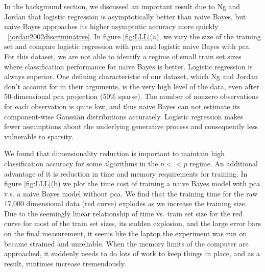 	In the background section, we discussed an important result due to Ng and Jordan that logistic regression is asymptotically better than naive Bayes, but naive Bayes approaches its higher asymptotic accuracy more quickly ~\ref{jordan2002discriminative}. In figure \ref{fig:LLL}(a), we vary the size of the training set and compare logistic regression with pca and logistic naive Bayes with pca. For this dataset, we are not able to identify a regime of small train set sizes where classification performance for naive Bayes is better. Logistic regression is always superior. One defining characteristic of our dataset, which Ng and Jordan don't account for in their arguments, is the very high level of the data, even after 50-dimensional pca projection (50\% sparse). The number of nonzero observations for each observation is quite low, and thus naive Bayes can not estimate its component-wise Gaussian distributions accurately. Logistic regression makes fewer assumptions about the underlying generative process and consequently less vulnerable to sparsity. 

	We found that dimensionality reduction is important to maintain high classification accuracy for some algorithms in the $n << p$ regime. An additional advantage of it is reduction in time and memory requirements for training. In figure \ref{fig:LLL}(b) we plot the time cost of training a naive Bayes model with pca v.s. a naive Bayes model without pca. We find that the training time for the raw 17,000 dimensional data (red curve) explodes as we increase the training size. Due to the seemingly linear relationship of time vs. train set size for the red curve for most of the train set sizes, its sudden explosion, and the large error bars on the final measurement, it seems like the laptop the experiment was run on became strained and unreliable. When the memory limits of the computer are approached, it suddenly needs to do lots of work to keep things in place, and as a result, runtimes increase tremendously. 


